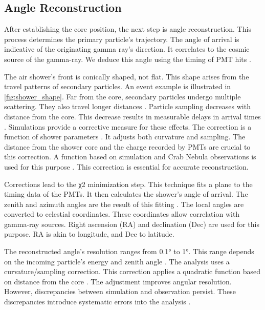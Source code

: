 \subsection{Angle Reconstruction} \label{sec:hawc_angleReco}

After establishing the core position, the next step is angle reconstruction.
This process determines the primary particle's trajectory.
The angle of arrival is indicative of the originating gamma ray's direction.
It correlates to the cosmic source of the gamma-ray.
We deduce this angle using the timing of PMT hits \cite{Abeysekara_2017}.

The air shower's front is conically shaped, not flat.
This shape arises from the travel patterns of secondary particles.
An event example is illustrated in \cref{fig:shower_shape}.
Far from the core, secondary particles undergo multiple scattering.
They also travel longer distances \cite{wcd_Sensitivity}.
Particle sampling decreases with distance from the core.
This decrease results in measurable delays in arrival times \cite{wcd_Sensitivity,Abeysekara_2017}.
Simulations provide a corrective measure for these effects.
The correction is a function of shower parameters \cite{Abeysekara_2017}.
It adjusts both curvature and sampling.
The distance from the shower core and the charge recorded by PMTs are crucial to this correction.
A function based on simulation and Crab Nebula observations is used for this purpose \cite{Abeysekara_2017}.
This correction is essential for accurate reconstruction.

Corrections lead to the χ2 minimization step.
This technique fits a plane to the timing data of the PMTs.
It then calculates the shower's angle of arrival.
The zenith and azimuth angles are the result of this fitting \cite{wcd_Sensitivity}.
The local angles are converted to celestial coordinates.
These coordinates allow correlation with gamma-ray sources.
Right ascension (RA) and declination (Dec) are used for this purpose.
RA is akin to longitude, and Dec to latitude.

The reconstructed angle's resolution ranges from 0.1° to 1°.
This range depends on the incoming particle's energy and zenith angle \cite{wcd_Sensitivity}.
The analysis uses a curvature/sampling correction.
This correction applies a quadratic function based on distance from the core \cite{Abeysekara_2017}.
The adjustment improves angular resolution.
However, discrepancies between simulation and observation persist.
These discrepancies introduce systematic errors into the analysis \cite{Abeysekara_2017}.

